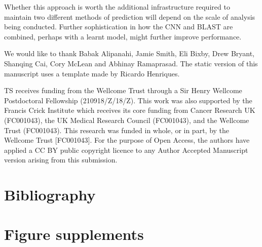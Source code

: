 Whether this approach is worth the additional infrastructure required to maintain two different methods of prediction will depend on the scale of analysis being conducted. Further sophistication in how the CNN and BLAST are combined, perhaps with a learnt model, might further improve performance.


\begin{acknowledgements}
  We would like to thank Babak Alipanahi, Jamie Smith, Eli Bixby, Drew Bryant, Shanqing Cai, Cory McLean and Abhinay Ramaprasad. The static version of this manuscript uses a template made by Ricardo Henriques.

  TS receives funding from the Wellcome Trust through a Sir Henry Wellcome Postdoctoral Fellowship (210918/Z/18/Z). This work was also supported by the Francis Crick Institute which receives its core funding from Cancer Research UK (FC001043), the UK Medical Research Council (FC001043), and the Wellcome Trust (FC001043). This research was funded in whole, or in part, by the Wellcome Trust [FC001043]. For the purpose of Open Access, the authors have applied a CC BY public copyright licence to any Author Accepted Manuscript version arising from this submission.

\end{acknowledgements}

\section*{Bibliography}

  
\newpage
\onecolumn


\beginsupplement
\section{Figure supplements}


